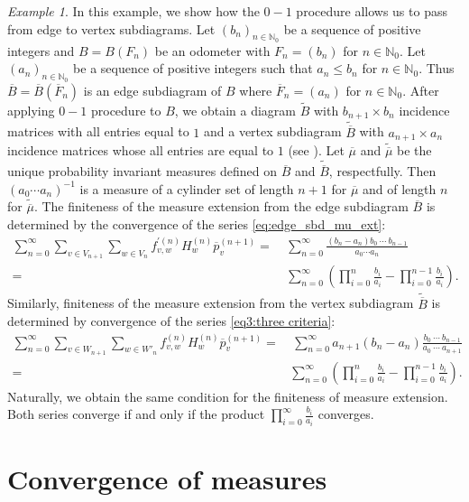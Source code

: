 \documentclass[11pt,reqno]{amsart}
\theoremstyle{definition}
\theoremstyle{remark}
\newtheorem{example}[definition]{Example}
\theoremstyle{plain}
\def\ol{\overline}
\def\ov{\overline}
\def\tl{\widetilde}
\newcommand{\N}{\mathbb N}
\newcommand{\ba}{\begin{aligned}}
\newcommand{\ea}{\end{aligned}}
\numberwithin{equation}{section}
\begin{document}
\begin{example}
In this example, we show how the $0-1$ procedure allows us to pass from edge to vertex subdiagrams. Let $(b_n)_{n \in \N_0}$ be a sequence of positive integers and $B = B(F_n)$ be an odometer with $F_n = (b_n)$ for $n \in \N_0$. Let $(a_n)_{n \in \N_0}$ be a sequence of positive integers such that $a_n \leq b_n$ for $n \in \N_0$. Thus $\ov B = \ov B(\ov F_n)$ is an edge subdiagram of $B$ where $\ov F_n = (a_n)$ for $n \in \N_0$. After applying $0-1$ procedure to $B$, we obtain a diagram $\tl B$ with $b_{n+1} \times b_n$ incidence matrices with all entries equal to $1$ and a vertex subdiagram $\widetilde{\ov B}$ with $a_{n+1} \times a_n$ incidence matrices whose all entries are equal to $1$ (see ). Let $\ov \mu$ and $\tl {\ov \mu}$ be the unique probability invariant measures defined on $\ov B$ and $\tl {\ov B}$, respectfully. Then 
$(a_0 \cdots a_n)^{-1}$ is a measure of a cylinder set of length $n+1$ for $\ov \mu$ and of length $n$ for $\tl{\ov \mu}$. The finiteness of the measure extension from the edge subdiagram $\ov B$ is determined by the convergence of the series \eqref{eq:edge_sbd_mu_ext}:
$$
\ba 
\sum_{n=0}^{\infty} \sum_{v \in V_{n+1}} \sum_{w \in V_{n}} f_{v,w}^{'(n)} H_w^{(n)}\overline{p}_v^{(n+1)} = &\ \sum_{n=0}^{\infty} \frac{(b_n - a_n)b_0 \ \cdots\ b_{n-1}}{a_0 \cdots a_n}\\
=&\  \sum_{n=0}^{\infty} \left(\prod_{i = 0}^n\frac{b_i}{a_i} - \prod_{i = 0}^{n-1}\frac{b_i}{a_i}\right).
\ea
$$
Similarly, finiteness of the measure extension from the vertex subdiagram $\tl{\ov B}$ is determined by convergence of the series \eqref{eq3:three criteria}:
$$
\ba 
\sum_{n=0}^\infty \sum_{v \in W_{n+1}} 
\sum_{w \in W'_n} f^{(n)}_{v,w} H_w^{(n)} \ol p_v^{(n+1)} = &\ \sum_{n=0}^\infty a_{n+1}(b_{n} - a_{n})\frac{b_0\ \cdots\ b_{n-1}}{a_0 \ \cdots \ a_{n+1}}\\
= & \sum_{n=0}^{\infty} \left(\prod_{i = 0}^n\frac{b_i}{a_i} - \prod_{i = 0}^{n-1}\frac{b_i}{a_i}\right).
\ea
$$
Naturally, we obtain the same condition for the finiteness of measure extension. Both series converge if and only if the product $\prod_{i =0}^\infty \frac{b_i}{a_i}$ converges.
\end{example}
    
 
\section{Convergence of measures}\label{Sec: conv of measures}
\end{document}
